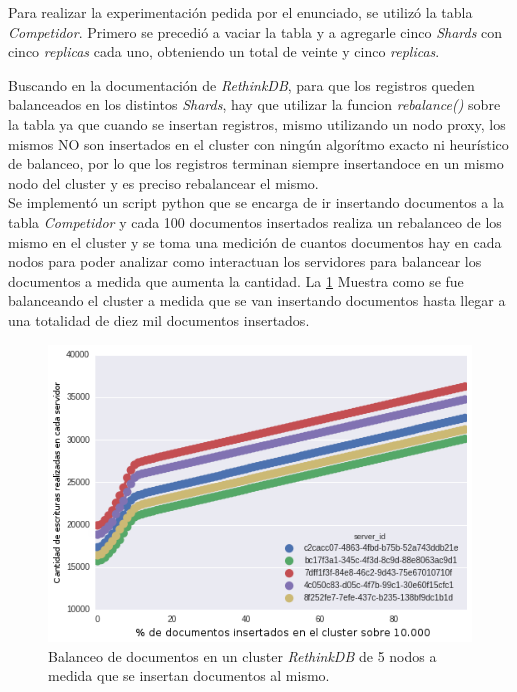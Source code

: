 Para realizar la experimentación pedida por el enunciado, se utilizó la tabla \textit{Competidor}. Primero se precedió a vaciar la tabla y a agregarle cinco \textit{Shards} con cinco \textit{replicas} cada uno, obteniendo un total de veinte y cinco \textit{replicas}.

Buscando en la documentación de \textit{RethinkDB}, para que los registros queden balanceados en los distintos \textit{Shards}, hay que utilizar la funcion \textit{rebalance()} sobre la tabla ya que cuando se insertan registros, mismo utilizando un nodo proxy, los mismos NO son insertados en el cluster con ningún algorítmo exacto ni heurístico de balanceo, por lo que los registros terminan siempre insertandoce en un mismo nodo del cluster y es preciso rebalancear el mismo. \\

Se implementó un script python que se encarga de ir insertando documentos a la tabla \textit{Competidor} y cada 100 documentos insertados realiza un rebalanceo de los mismo en el cluster y se toma una medición de cuantos documentos hay en cada nodos para poder analizar como interactuan los servidores para balancear los documentos a medida que aumenta la cantidad. La \ref{fig: cluster} Muestra como se fue balanceando el cluster a medida que se van insertando documentos hasta llegar a una totalidad de diez mil documentos insertados. \\

\begin{figure}[H]
  \centering
    \includegraphics[scale=0.6]{../graficos/cluster.png}
  \caption{Balanceo de documentos en un cluster \textit{RethinkDB} de 5 nodos a medida que se insertan documentos al mismo.}
  \label{fig: cluster}
\end{figure}

